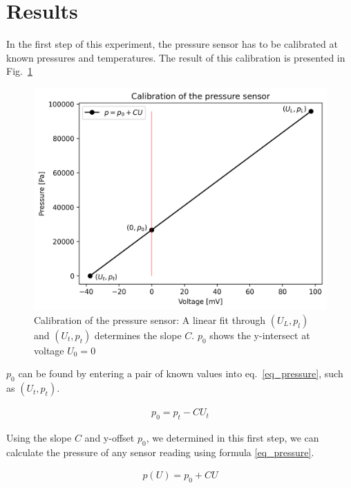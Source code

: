 \section{Results}\label{sec_results}

    In the first step of this experiment, the pressure sensor has to be calibrated at known pressures and temperatures.
    The result of this calibration is presented in Fig.~\ref{fig_calibration}

    \begin{figure}[H]
        \centering
        \includegraphics[]{src/images/calibration.png}
        \caption{Calibration of the pressure sensor: A linear fit through $(U_L,p_l)$ and $(U_t,p_t)$ determines the slope $C$. $p_0$ shows the y-intersect at voltage $U_0 = 0$}
        \label{fig_calibration}
    \end{figure}

    $p_0$ can be found by entering a pair of known values into eq.~\ref{eq_pressure}, such as $(U_t,p_t)$.

    \begin{align}
        p_0 = p_t - C U_t \label{eq_p0}
    \end{align}

    Using the slope $C$ and y-offset $p_0$, we determined in this first step, we can calculate the pressure
    of any sensor reading using formula \ref{eq_pressure}.

    \begin{align}
        p(U) = p_0 + CU \label{eq_pressure}
    \end{align}

